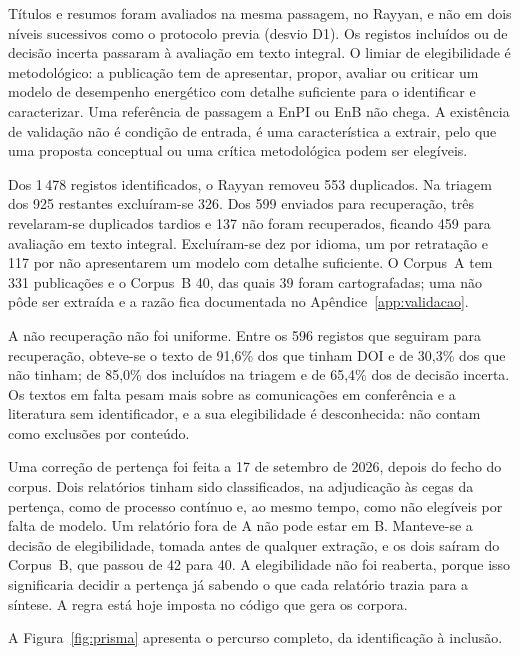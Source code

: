 Títulos e resumos foram avaliados na mesma passagem, no Rayyan, e não em
dois níveis sucessivos como o protocolo previa (desvio D1). Os registos
incluídos ou de decisão incerta passaram à avaliação em texto integral.
O limiar de elegibilidade é metodológico: a publicação tem de apresentar,
propor, avaliar ou criticar um modelo de desempenho energético com detalhe
suficiente para o identificar e caracterizar. Uma referência de passagem a
EnPI ou EnB não chega. A existência de validação não é condição de entrada,
é uma característica a extrair, pelo que uma proposta conceptual ou uma
crítica metodológica podem ser elegíveis.

Dos 1\,478 registos identificados, o Rayyan removeu 553 duplicados. Na
triagem dos 925 restantes excluíram-se 326. Dos 599 enviados para
recuperação, três revelaram-se duplicados tardios e 137 não foram
recuperados, ficando 459 para avaliação em texto integral. Excluíram-se
dez por idioma, um por retratação e 117 por não apresentarem um modelo com
detalhe suficiente. O Corpus~A tem 331 publicações e o Corpus~B 40, das
quais 39 foram cartografadas; uma não pôde ser extraída e a razão fica
documentada no Apêndice~\ref{app:validacao}.

A não recuperação não foi uniforme. Entre os 596 registos que seguiram
para recuperação, obteve-se o texto de 91,6\% dos que tinham DOI e de
30,3\% dos que não tinham; de 85,0\% dos incluídos na triagem e de 65,4\%
dos de decisão incerta. Os textos em falta pesam mais sobre as
comunicações em conferência e a literatura sem identificador, e a sua
elegibilidade é desconhecida: não contam como exclusões por conteúdo.

Uma correção de pertença foi feita a 17 de setembro de 2026, depois do
fecho do corpus. Dois relatórios tinham sido classificados, na adjudicação
às cegas da pertença, como de processo contínuo e, ao mesmo tempo, como não
elegíveis por falta de modelo. Um relatório fora de A não pode estar em B.
Manteve-se a decisão de elegibilidade, tomada antes de qualquer extração, e
os dois saíram do Corpus~B, que passou de 42 para 40. A elegibilidade não
foi reaberta, porque isso significaria decidir a pertença já sabendo o que
cada relatório trazia para a síntese. A regra está hoje imposta no código
que gera os corpora.



A Figura~\ref{fig:prisma} apresenta o percurso completo, da identificação à inclusão.




